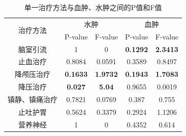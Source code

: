 \documentclass[bwprint]{gmcmthesis}
\begin{document}
\begin{table}[h]  %
	\centering     %
	\caption{单一治疗方法与血肿、水肿之间的P值和F值}  %
	\label{单一治疗方法与血肿、水肿之间的P值和F值}        %
	\begin{tabular}{ c c c c c }  %
		\toprule[1.5pt]   %
		
		\multirow{2}{1cm}{治疗方法} & \multicolumn{2}{c}{水肿} & \multicolumn{2}{c}{血肿} \\ 
						&P-value    & F-value  & P-value    & F-value   \\ 
		
		\midrule[1pt]     %
		
		脑室引流	 	& 1       & 0      & \textbf{0.1292 }&\textbf{ 2.3413} \\ 
		止血治疗		& 0.8084  & 0.0591 & 0.3589 & 0.8497 \\ 
		降颅压治疗	    & \textbf{0.1633}  & \textbf{1.9732} & \textbf{0.1943} & \textbf{1.7083} \\ 
		降压治疗 		& \textbf{0.027}   &\textbf{ 5.04}   & 0.9655 & 0.0019 \\ 
		镇静、镇痛治疗 	& 0.7821  & 0.0769 & 0.387  & 0.755  \\ 
            止吐护胃 		& 0.5624  & 0.3379 & 0.2924 & 1.1206 \\ 
            营养神经 		& 1       & 0      & 0.4352 & 0.614  \\ 
		
		\bottomrule[1.5pt]   %
	\end{tabular} 
\end{table}
\end{document}
